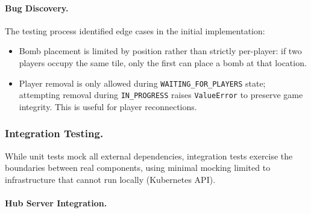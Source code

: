 \paragraph{Bug Discovery.}
The testing process identified edge cases in the initial implementation:
\begin{itemize}
    \item Bomb placement is limited by position rather than strictly per-player: if two players occupy the same tile, only the first can place a bomb at that location.
    \item Player removal is only allowed during \texttt{WAITING\_FOR\_PLAYERS} state; attempting removal during \texttt{IN\_PROGRESS} raises \texttt{ValueError} to preserve game integrity. This is useful for player reconnections.
\end{itemize}

\subsubsection{Integration Testing.}

While unit tests mock all external dependencies, integration tests exercise the boundaries between real components, using minimal mocking limited to infrastructure that cannot run locally (Kubernetes API).

\paragraph{Hub Server Integration.}

